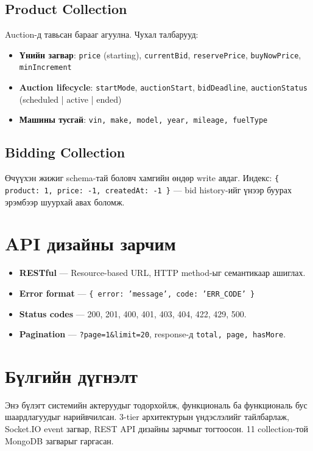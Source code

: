 \documentclass[12pt, a4paper]{report}
\begin{document}
\subsection{Product Collection}

Auction-д тавьсан барааг агуулна. Чухал талбарууд:

\begin{itemize}
  \item \textbf{Үнийн загвар}: \texttt{price} (starting), \texttt{currentBid}, \texttt{reservePrice}, \texttt{buyNowPrice}, \texttt{minIncrement}
  \item \textbf{Auction lifecycle}: \texttt{startMode}, \texttt{auctionStart}, \texttt{bidDeadline}, \texttt{auctionStatus} (scheduled | active | ended)
  \item \textbf{Машины тусгай}: \texttt{vin, make, model, year, mileage, fuelType}
\end{itemize}

\subsection{Bidding Collection}

Өчүүхэн жижиг schema-тай боловч хамгийн өндөр write авдаг. Индекс: \texttt{\{ product: 1, price: -1, createdAt: -1 \}} — bid history-ийг үнээр буурах эрэмбээр шуурхай авах боломж.

\section{API дизайны зарчим}

\begin{itemize}
  \item \textbf{RESTful} — Resource-based URL, HTTP method-ыг семантикаар ашиглах.
  \item \textbf{Error format} — \texttt{\{ error: 'message', code: 'ERR\_CODE' \}}
  \item \textbf{Status codes} — 200, 201, 400, 401, 403, 404, 422, 429, 500.
  \item \textbf{Pagination} — \texttt{?page=1\&limit=20}, response-д \texttt{total, page, hasMore}.
\end{itemize}

\section{Бүлгийн дүгнэлт}

Энэ бүлэгт системийн актеруудыг тодорхойлж, функциональ ба функциональ бус шаардлагуудыг нарийвчилсан. 3-tier архитектурын үндэслэлийг тайлбарлаж, Socket.IO event загвар, REST API дизайны зарчмыг тогтоосон. 11 collection-той MongoDB загварыг гаргасан.
\end{document}
